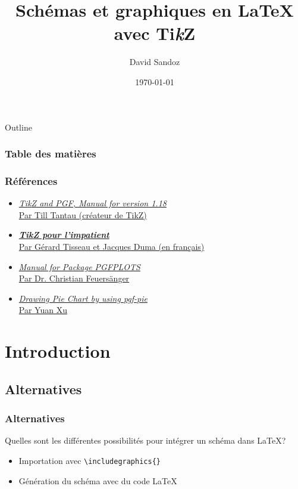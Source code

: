 \documentclass{clic_latex_beamer}
\newcommand{\TikZ}{Ti\textit{k}Z}
\begin{document}
\title{Schémas et graphiques en \LaTeX{} avec \TikZ}
\author{David Sandoz}
\date{\today}
\titlegraphic{\ccbysa}

\frame{\titlepage}


\begin{frame}[allowframebreaks]{Outline}
\frametitle{Table des matières}
\tableofcontents[]
\end{frame}

 
\begin{frame}
\frametitle{Références}
\begin{itemize}
\item \href{http://paws.wcu.edu/tsfoguel/tikzpgfmanual.pdf }{\emph{\TikZ{} and PGF, Manual for version 1.18}\\ Par Till Tantau (créateur de TikZ)}
\item \href{http://math.et.info.free.fr/TikZ/bdd/TikZ-Impatient.pdf}{\emph{\textbf{\TikZ{} pour l’impatient}}\\ Par Gérard Tisseau et Jacques Duma (en français)}
\item \href{http://pgfplots.sourceforge.net/pgfplots.pdf}{\emph{Manual for Package \uppercase{pgfplots}}\\ Par Dr. Christian Feuersänger}
\item \href{http://pgf-pie.googlecode.com/git/release/pgf-pie-0.2/pgf-pie-manual.pdf}{\emph{Drawing Pie Chart by using pgf-pie}\\ Par Yuan Xu}
\end{itemize}
\end{frame}


\section{Introduction}
\subsection{Alternatives}
\begin{frame}
\frametitle{Alternatives}
Quelles sont les différentes possibilités pour intégrer un schéma dans \LaTeX ?
\begin{itemize}
\item Importation avec \texttt{\textbackslash includegraphics\{\}}
\item Génération du schéma avec du code \LaTeX
\end{itemize}
\end{frame}
 
\end{document}
